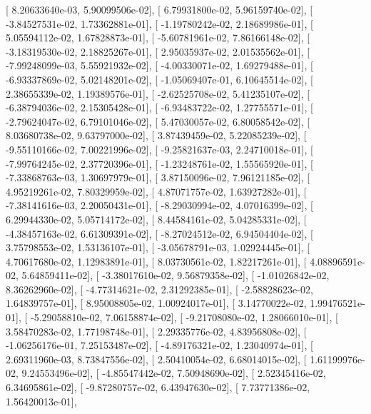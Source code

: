 \documentclass{article}
\begin{document}
       [  8.20633640e-03,   5.90099506e-02],
       [  6.79931800e-02,   5.96159740e-02],
       [ -3.84527531e-02,   1.73362881e-01],
       [ -1.19780242e-02,   2.18689986e-01],
       [  5.05594112e-02,   1.67828873e-01],
       [ -5.60781961e-02,   7.86166148e-02],
       [ -3.18319530e-02,   2.18825267e-01],
       [  2.95035937e-02,   2.01535562e-01],
       [ -7.99248099e-03,   5.55921932e-02],
       [ -4.00330071e-02,   1.69279488e-01],
       [ -6.93337869e-02,   5.02148201e-02],
       [ -1.05069407e-01,   6.10645514e-02],
       [  2.38655339e-02,   1.19389576e-01],
       [ -2.62525708e-02,   5.41235107e-02],
       [ -6.38794036e-02,   2.15305428e-01],
       [ -6.93483722e-02,   1.27755571e-01],
       [ -2.79624047e-02,   6.79101046e-02],
       [  5.47030057e-02,   6.80058542e-02],
       [  8.03680738e-02,   9.63797000e-02],
       [  3.87439459e-02,   5.22085239e-02],
       [ -9.55110166e-02,   7.00221996e-02],
       [ -9.25821637e-03,   2.24710018e-01],
       [ -7.99764245e-02,   2.37720396e-01],
       [ -1.23248761e-02,   1.55565920e-01],
       [ -7.33868763e-03,   1.30697979e-01],
       [  3.87150096e-02,   7.96121185e-02],
       [  4.95219261e-02,   7.80329959e-02],
       [  4.87071757e-02,   1.63927282e-01],
       [ -7.38141616e-03,   2.20050431e-01],
       [ -8.29030994e-02,   4.07016399e-02],
       [  6.29944330e-02,   5.05714172e-02],
       [  8.44584161e-02,   5.04285331e-02],
       [ -4.38457163e-02,   6.61309391e-02],
       [ -8.27024512e-02,   6.94504404e-02],
       [  3.75798553e-02,   1.53136107e-01],
       [ -3.05678791e-03,   1.02924445e-01],
       [  4.70617680e-02,   1.12983891e-01],
       [  8.03730561e-02,   1.82217261e-01],
       [  4.08896591e-02,   5.64859411e-02],
       [ -3.38017610e-02,   9.56879358e-02],
       [ -1.01026842e-02,   8.36262960e-02],
       [ -4.77314621e-02,   2.31292385e-01],
       [ -2.58828623e-02,   1.64839757e-01],
       [  8.95008805e-02,   1.00924017e-01],
       [  3.14770022e-02,   1.99476521e-01],
       [ -5.29058810e-02,   7.06158874e-02],
       [ -9.21708080e-02,   1.28066010e-01],
       [  3.58470283e-02,   1.77198748e-01],
       [  2.29335776e-02,   4.83956808e-02],
       [ -1.06256176e-01,   7.25153487e-02],
       [ -4.89176321e-02,   1.23040974e-01],
       [  2.69311960e-03,   8.73847556e-02],
       [  2.50410054e-02,   6.68014015e-02],
       [  1.61199976e-02,   9.24553496e-02],
       [ -4.85547442e-02,   7.50948690e-02],
       [  2.52345416e-02,   6.34695861e-02],
       [ -9.87280757e-02,   6.43947630e-02],
       [  7.73771386e-02,   1.56420013e-01],
\end{document}
